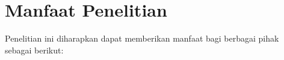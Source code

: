 %		
%
%
%
%		

\section{Manfaat Penelitian}

Penelitian ini diharapkan dapat memberikan manfaat bagi berbagai pihak sebagai berikut:

